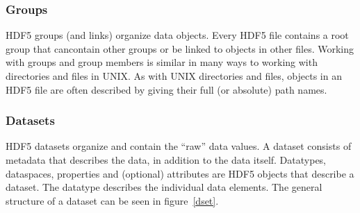 \subsubsection{Groups}
HDF5 groups (and links) organize data objects. Every HDF5 file contains a root group that cancontain other groups or be linked to objects in other files. Working with groups and group members is similar in many ways to working with directories and files in UNIX. As with UNIX directories and files, objects in an HDF5 file are often described by giving their full (or absolute) path names.

\subsubsection{Datasets}
HDF5 datasets organize and contain the “raw” data values. A dataset consists of metadata that describes the data, in addition to the data itself. Datatypes, dataspaces, properties and (optional) attributes are HDF5 objects that describe a dataset. The datatype describes the individual data elements. The general structure of a dataset can be seen in figure~\ref{dset}.












